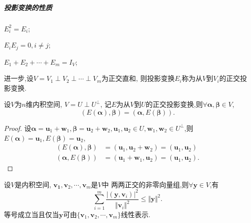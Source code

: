 \subparagraph{\color{ecolor}投影变换的性质}
\begin{asparaenum}[(1)]

\item $E_i^2=E_i$;

\item $E_iE_j=0, i\neq j$;

\item $E_1+E_2+\cdots+E_m=I_V$;
\end{asparaenum}

进一步,设$V=V_1\perp V_2\perp\cdots\perp V_m$为正交直和,
则投影变换$E_i$称为从$V$到$V_i$的{\heiti 正交投影变换}.

\begin{theory}
设$V$为$n$维内积空间, $V=U\perp U^{\perp}$, 
记$E$为从$V$到$U$的正交投影变换,则$\forall \bm{\alpha}, \bm{\beta} \in V$,
\[
(E(\bm{\alpha}),\bm{\beta}) = (\bm{\alpha},E(\bm{\beta})).
\]
\end{theory}

\begin{proof}
设$\bm{\alpha}=\bm{u}_1+\bm{w}_1, \bm{\beta}=\bm{u}_2+\bm{w}_2, 
\bm{u}_1,\bm{u}_2\in U, \bm{w}_1,\bm{w}_2\in U^{\perp}$,则
$E(\bm{\alpha})=\bm{u}_1, E(\bm{\beta})=\bm{u}_2$,
\begin{align*}
  (E(\bm{\alpha}),\bm{\beta}) & = (\bm{u}_1,\bm{u}_2+\bm{w}_2) = (\bm{u}_1,\bm{u}_2)\\
  (\bm{\alpha},E(\bm{\beta})) & = (\bm{u}_1+\bm{w}_1,\bm{u}_2) = (\bm{u}_1,\bm{u}_2).
\end{align*}
\end{proof}

\begin{theorem}[Bessel不等式]
  设$V$是内积空间, $\bm{\bm{v}_1},\bm{v}_2,\cdots,\bm{v}_m$是$V$中
  两两正交的非零向量组,则$\forall \bm{y}\in V$,有
  \[
  \sum_{i=1}^m\frac{|(\bm{y},\bm{v}_i)|^2}{\Vert\bm{v}_i\Vert^2} \leq \Vert\bm{y}\Vert^2. 
  \]
  等号成立当且仅当$\bm{y}$可由$\{\bm{v}_1,\bm{v}_2,\cdots,\bm{v}_m\}$线性表示.
\end{theorem}

